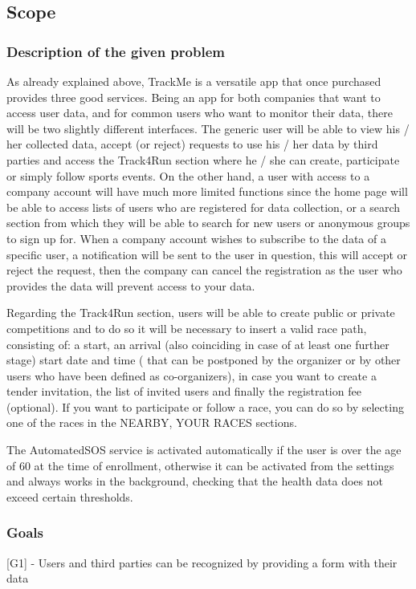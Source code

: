 \subsection{Scope}
\subsubsection{Description of the given problem}
As already explained above, TrackMe is a versatile app that once purchased provides three good services. Being an app for both companies that want to access user data, and for common users who want to monitor their data, there will be two slightly different interfaces. The generic user will be able to view his / her collected data, accept (or reject) requests to use his / her data by third parties and access the Track4Run section where he / she can create, participate or simply follow sports events. On the other hand, a user with access to a company account will have much more limited functions since the home page will be able to access lists of users who are registered for data collection, or a search section from which they will be able to search for new users or anonymous groups to sign up for. When a company account wishes to subscribe to the data of a specific user, a notification will be sent to the user in question, this will accept or reject the request, then the company can cancel the registration as the user who provides the data will prevent access to your data.

Regarding the Track4Run section, users will be able to create public or private competitions and to do so it will be necessary to insert a valid race path, consisting of: a start, an arrival (also coinciding in case of at least one further stage) start date and time ( that can be postponed by the organizer or by other users who have been defined as co-organizers), in case you want to create a tender invitation, the list of invited users and finally the registration fee (optional). If you want to participate or follow a race, you can do so by selecting one of the races in the NEARBY, YOUR RACES sections.

The AutomatedSOS service is activated automatically if the user is over the age of 60 at the time of enrollment, otherwise it can be activated from the settings and always works in the background, checking that the health data does not exceed certain thresholds.
\subsubsection{Goals}
[G1] - Users and third parties can be recognized by providing a form with their data\newline


